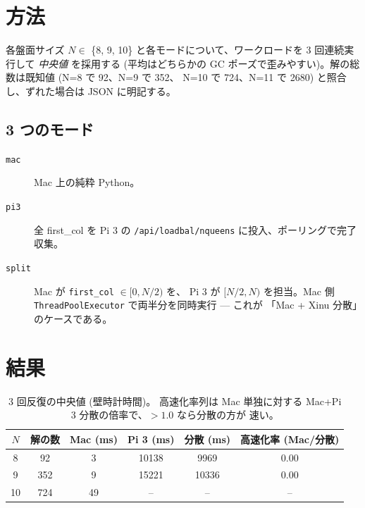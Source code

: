 \documentclass[a4paper,11pt]{ltjsarticle}
\begin{document}
\section{方法}

各盤面サイズ $N \in$ \{8, 9, 10\} と各モードについて、ワークロードを
3 回連続実行して \emph{中央値} を採用する (平均はどちらかの
GC ポーズで歪みやすい)。解の総数は既知値 (N=8 で 92、N=9 で 352、
N=10 で 724、N=11 で 2680) と照合し、ずれた場合は JSON に明記する。

\subsection{3 つのモード}
\begin{description}
  \item[\texttt{mac}] Mac 上の純粋 Python。
  \item[\texttt{pi3}] 全 first\_col を Pi 3 の
        \texttt{/api/loadbal/nqueens} に投入、ポーリングで完了収集。
  \item[\texttt{split}] Mac が \texttt{first\_col} $\in [0, N/2)$ を、
        Pi 3 が $[N/2, N)$ を担当。Mac 側
        \texttt{ThreadPoolExecutor} で両半分を同時実行 — これが
        「Mac + Xinu 分散」のケースである。
\end{description}

\section{結果}

\begin{table}[h]
\centering
\begin{tabular}{cccccc}
\toprule
$N$ & 解の数 & Mac (ms) & Pi 3 (ms) & 分散 (ms) & 高速化率 (Mac/分散) \\
\midrule
8 & 92 & 3 & 10138 & 9969 & 0.00 \\
9 & 352 & 9 & 15221 & 10336 & 0.00 \\
10 & 724 & 49 & -- & -- & -- \\
\bottomrule
\end{tabular}
\caption{3 回反復の中央値 (壁時計時間)。
高速化率列は Mac 単独に対する Mac+Pi 3 分散の倍率で、$> 1.0$ なら分散の方が
速い。}
\label{tab:results}
\end{table}
\end{document}
